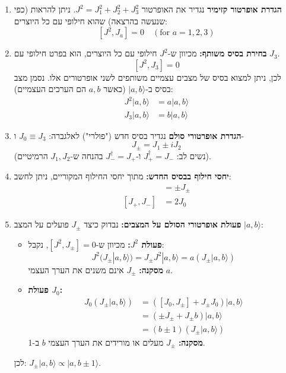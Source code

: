 \begin{enumerate}
    \item \textbf{הגדרת אופרטור קזימיר }
    נגדיר את האופרטור $J^2 = J_1^2 + J_2^2 + J_3^2$.
    ניתן להראות (כפי שנעשה בהרצאה) שהוא חילופי עם כל היוצרים:
    $$ [J^2, J_a] = 0 \quad (\text{for } a=1,2,3) $$
    
    \item \textbf{בחירת בסיס משותף:}
    מכיוון ש-$J^2$ חילופי עם כל היוצרים, הוא בפרט חילופי עם $J_3$.
    $$ [J^2, J_3] = 0 $$
    לכן, ניתן למצוא בסיס של מצבים עצמיים משותפים לשני אופרטורים אלו. נסמן מצב בסיס ב-$|a, b\rangle$ (כאשר $a,b$ הם הערכים העצמיים):
    \begin{align*}
        J^2 |a, b\rangle &= a |a, b\rangle \\
        J_3 |a, b\rangle &= b |a, b\rangle
    \end{align*}

    \item \textbf{הגדרת אופרטורי סולם  }
    נגדיר בסיס חדש ("פולרי") לאלגברה: $J_0 \equiv J_3$ ו-
    $$ J_{\pm} = J_1 \pm i J_2 $$
    (נשים לב: $J_+^\dagger = J_-$ ו-$J_-^\dagger = J_+$ בהנחה ש-$J_1, J_2$ הרמיטיים).
    
    \item \textbf{יחסי חילוף בבסיס החדש:}
    מתוך יחסי החילוף המקוריים, ניתן לחשב:
    \begin{align*}
        [J_0, J_{\pm}] &= \pm J_{\pm} \\
        [J_+, J_-] &= 2J_0
    \end{align*}
    
    \item \textbf{פעולת אופרטורי הסולם על המצבים:}
    נבדוק כיצד $J_{\pm}$ פועלים על המצב $|a, b\rangle$:
    \begin{itemize}
        \item \textbf{פעולת $J^2$:} מכיוון ש-$[J^2, J_{\pm}] = 0$, נקבל:
        $$ J^2 (J_{\pm} |a, b\rangle) = J_{\pm} J^2 |a, b\rangle = a (J_{\pm} |a, b\rangle) $$
        \textbf{מסקנה:} $J_{\pm}$ אינם משנים את הערך העצמי $a$.
        
        \item \textbf{פעולת $J_0$:}
        \begin{align*}
            J_0 (J_{\pm} |a, b\rangle) &= ([J_0, J_{\pm}] + J_{\pm} J_0) |a, b\rangle \\
            &= (\pm J_{\pm} + J_{\pm} b) |a, b\rangle \\
            &= (b \pm 1) (J_{\pm} |a, b\rangle)
        \end{align*}
        \textbf{מסקנה:} $J_{\pm}$ מעלים או מורידים את הערך העצמי $b$ ב-1.
    \end{itemize}
    לכן: $J_{\pm} |a, b\rangle \propto |a, b \pm 1\rangle$.
    

\end{enumerate}
